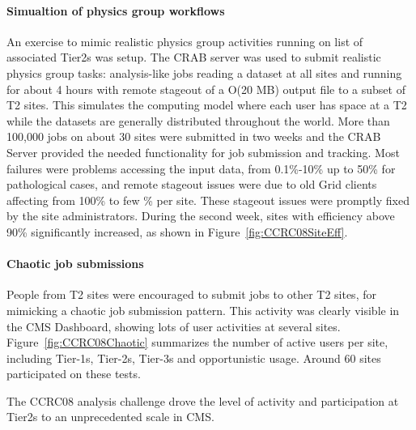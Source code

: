 \paragraph{Simualtion of physics group workflows}
An exercise to mimic realistic physics group activities running
on list of associated Tier2s was setup. 
The CRAB server was used to submit realistic physics group tasks: 
analysis-like jobs reading a dataset at all sites and running for 
about 4 hours with remote stageout of a O(20 MB) output file to a subset of T2
sites. This simulates the computing model where each user has space at a T2 while the datasets are generally distributed throughout the world.
More than 100,000 jobs on about 30 sites were submitted in two weeks and 
the CRAB Server provided the needed functionality for job submission and 
tracking. %
Most failures were problems accessing the input data, from 0.1\%-10\% up to 50\% for pathological cases, and remote stageout issues were due to old Grid clients affecting from 100\% to few \% per site. These stageout issues were
promptly fixed by the site administrators. 
During the second week, sites with efficiency above 90\% significantly increased, as shown in Figure~\ref{fig:CCRC08SiteEff}.
\paragraph{Chaotic job submissions}
People from T2 sites were encouraged to submit jobs to other T2 sites, for mimicking a chaotic job submission pattern. This activity was clearly visible in the CMS Dashboard, showing lots of user activities at several sites. Figure~\ref{fig:CCRC08Chaotic} summarizes the number of active users per site, including Tier-1s, Tier-2s, Tier-3s and opportunistic usage. Around 60 sites participated on these tests.

The CCRC08 analysis challenge drove the level of activity and participation at Tier2s to an unprecedented scale in CMS.

